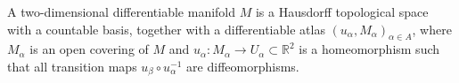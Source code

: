 A two-dimensional differentiable manifold $M$ is a Hausdorff topological space with a countable basis, together with a differentiable atlas $(u_\alpha, M_\alpha)_{\alpha \in A}$, where $M_\alpha$ is an open covering of $M$ and $u_\alpha: M_\alpha \to U_\alpha \subset \mathbb{R}^2$ is a homeomorphism such that all transition maps $u_\beta \circ u_\alpha^{-1}$ are diffeomorphisms.